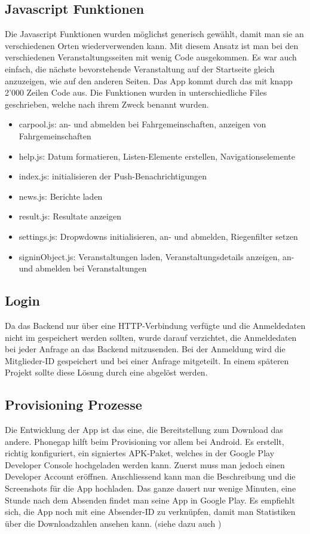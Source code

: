 \newpage
\FloatBarrier
\subsection{Javascript Funktionen}
Die Javascript Funktionen wurden möglichst generisch gewählt, damit man sie an verschiedenen Orten wiederverwenden kann. Mit diesem Ansatz ist man bei den verschiedenen Veranstaltungsseiten mit wenig Code ausgekommen. Es war auch einfach, die nächste bevorstehende Veranstaltung auf der Startseite gleich anzuzeigen, wie auf den anderen Seiten. Das App kommt durch das mit knapp 2'000 Zeilen Code aus. Die Funktionen wurden in unterschiedliche Files geschrieben, welche nach ihrem Zweck benannt wurden.
\begin{itemize}
\item carpool.js: an- und abmelden bei Fahrgemeinschaften, anzeigen von Fahrgemeinschaften
\item help.js:  Datum formatieren,  Listen-Elemente erstellen, Navigationselemente
\item index.js: initialisieren der Push-Benachrichtigungen
\item news.js: Berichte laden
\item result.js: Resultate anzeigen
\item settings.js: Dropwdowns initialisieren, an- und abmelden, Riegenfilter setzen
\item signinObject.js: Veranstaltungen laden, Veranstaltungsdetails anzeigen, an- und abmelden bei Veranstaltungen 
\end{itemize}

\subsection{Login}
Da das Backend nur über eine HTTP-Verbindung verfügte und die Anmeldedaten nicht im   gespeichert werden sollten, wurde darauf verzichtet, die Anmeldedaten bei jeder Anfrage an das Backend mitzusenden. Bei der Anmeldung wird die Mitglieder-ID gespeichert und bei einer Anfrage mitgeteilt. In einem späteren Projekt sollte diese Lösung durch eine  abgelöst werden.

\subsection{Provisioning Prozesse}
Die Entwicklung der App ist das eine, die Bereitstellung zum Download das andere. Phonegap hilft beim Provisioning vor allem bei Android. Es erstellt, richtig konfiguriert, ein signiertes APK-Paket, welches in der Google Play Developer Console hochgeladen werden kann. Zuerst muss man jedoch einen Developer Account eröffnen. Anschliessend kann man die Beschreibung und die Screenshots für die App hochladen. Das ganze dauert nur wenige Minuten, eine Stunde nach dem Absenden findet man seine App in Google Play. Es empfiehlt sich, die App noch mit eine Absender-ID zu verknüpfen, damit man Statistiken über die Downloadzahlen ansehen kann. (siehe dazu auch \cite{android_prov})

